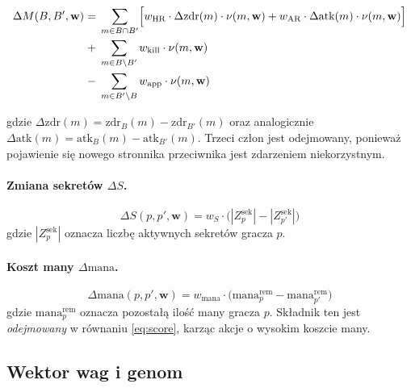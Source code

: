 \begin{equation}
\begin{split}
    \Delta M(B, B', \mathbf{w}) =\;
        & \sum_{m \in B \cap B'} \Bigl[
            w_{\text{HR}} \cdot \Delta\text{zdr}(m) \cdot \nu(m, \mathbf{w})
            + w_{\text{AR}} \cdot \Delta\text{atk}(m) \cdot \nu(m, \mathbf{w})
          \Bigr] \\
        +\; & \sum_{m \in B \setminus B'} w_{\text{kill}} \cdot \nu(m, \mathbf{w}) \\
        -\; & \sum_{m \in B' \setminus B} w_{\text{app}} \cdot \nu(m, \mathbf{w})
\end{split}
    \label{eq:delta_m}
\end{equation}

gdzie $\Delta\text{zdr}(m) = \text{zdr}_B(m) - \text{zdr}_{B'}(m)$ oraz analogicznie $\Delta\text{atk}(m) = \text{atk}_B(m) - \text{atk}_{B'}(m)$. Trzeci człon jest odejmowany, ponieważ pojawienie się nowego stronnika przeciwnika jest zdarzeniem niekorzystnym.

\paragraph{Zmiana sekretów $\Delta S$.}

\begin{equation}
    \Delta S(p, p', \mathbf{w}) =
        w_S \cdot \bigl(|Z^{\text{sek}}_p| - |Z^{\text{sek}}_{p'}|\bigr)
    \label{eq:delta_s}
\end{equation}
gdzie $|Z^{\text{sek}}_p|$ oznacza liczbę aktywnych sekretów gracza $p$.

\paragraph{Koszt many $\Delta\text{mana}$.}

\begin{equation}
    \Delta\text{mana}(p, p', \mathbf{w}) =
        w_{\text{mana}} \cdot
        \bigl(\text{mana}^{\text{rem}}_p - \text{mana}^{\text{rem}}_{p'}\bigr)
    \label{eq:delta_mana}
\end{equation}
gdzie $\text{mana}^{\text{rem}}_p$ oznacza pozostałą ilość many gracza $p$. Składnik ten jest \emph{odejmowany} w równaniu \eqref{eq:score}, karząc akcje o wysokim koszcie many.

\subsection{Wektor wag i genom}

